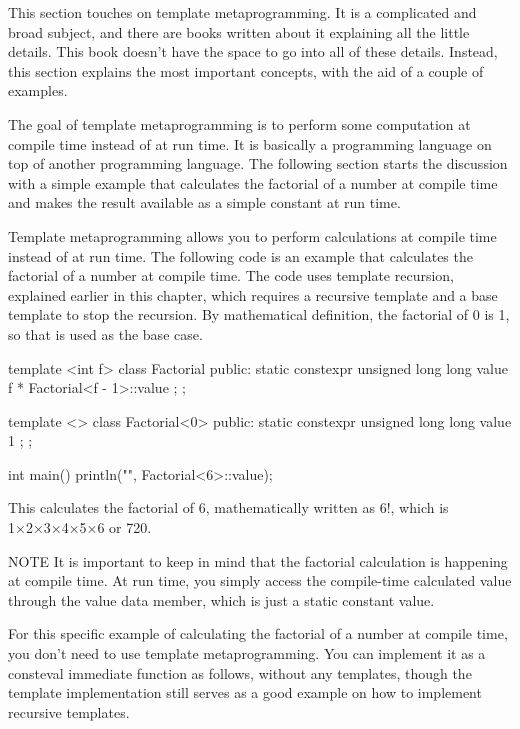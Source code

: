 
This section touches on template metaprogramming. It is a complicated and broad subject, and there are books written about it explaining all the little details. This book doesn’t have the space to go into all of these details. Instead, this section explains the most important concepts, with the aid of a couple of examples.

The goal of template metaprogramming is to perform some computation at compile time instead of at run time. It is basically a programming language on top of another programming language. The following section starts the discussion with a simple example that calculates the factorial of a number at compile time and makes the result available as a simple constant at run time.


Template metaprogramming allows you to perform calculations at compile time instead of at run time. The following code is an example that calculates the factorial of a number at compile time. The code uses template recursion, explained earlier in this chapter, which requires a recursive template and a base template to stop the recursion. By mathematical definition, the factorial of 0 is 1, so that is used as the base case.

\begin{cpp}
template <int f>
class Factorial
{
    public:
    static constexpr unsigned long long value { f * Factorial<f - 1>::value };
};

template <>
class Factorial<0>
{
    public:
    static constexpr unsigned long long value { 1 };
};

int main()
{
    println("{}", Factorial<6>::value);
}
\end{cpp}

This calculates the factorial of 6, mathematically written as 6!, which is 1×2×3×4×5×6 or 720.

\begin{myNotic}{NOTE}
It is important to keep in mind that the factorial calculation is happening at compile time. At run time, you simply access the compile-time calculated value through the value data member, which is just a static constant value.
\end{myNotic}

For this specific example of calculating the factorial of a number at compile time, you don’t need to use template metaprogramming. You can implement it as a consteval immediate function as follows, without any templates, though the template implementation still serves as a good example on how to implement recursive templates.


